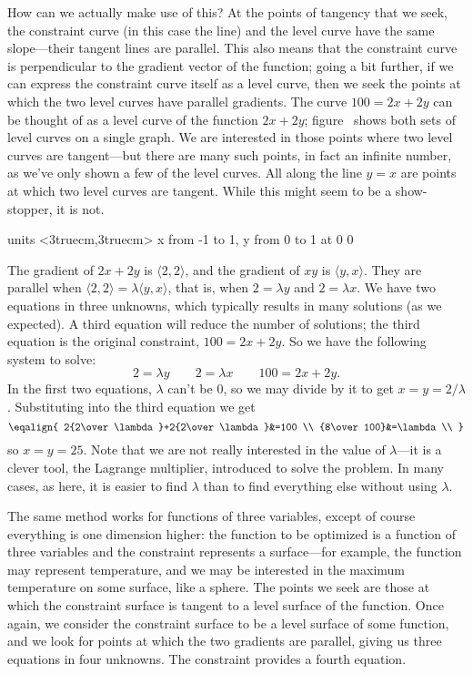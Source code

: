 How can we actually make use of this? At the points of tangency that
we seek, the constraint curve (in this case the line) and the level
curve have the same slope---their tangent lines are parallel. This also
means that the constraint curve is perpendicular to the gradient
vector of the function; going a bit further, if we can express the
constraint curve itself as a level curve, then we seek the points at
which the two level curves have parallel gradients.
The curve $100=2x+2y$ can be thought of as a level curve of the
function $2x+2y$; figure~ shows both sets of
level curves on a single graph. We are interested in those points
where two level curves are tangent---but there are many such points,
in fact an infinite number, as we've only shown a few of the level
curves. All along the line $y=x$ are points at which two level curves
are tangent. While this might seem to be a show-stopper, it is
not. 

\figure
\vbox{\beginpicture
\normalgraphs
\ninepoint
\setcoordinatesystem units <3truecm,3truecm>
\setplotarea x from -1 to 1, y from 0 to 1
 at 0 0
\endpicture}

The gradient of $2x+2y$ is $\langle 2,2\rangle$, and the gradient of
$xy$ is $\langle y,x\rangle$. They are parallel when
$\langle 2,2\rangle=\lambda\langle y,x\rangle$, that is, when
$2=\lambda y$ and $2=\lambda x$. We have two equations in three
unknowns, which typically results in many solutions (as we
expected). A third equation will reduce the number of solutions; the
third equation is the original constraint, $100=2x+2y$. So we have the
following system to solve:
$$2=\lambda y \qquad 2=\lambda x\qquad 100=2x+2y.$$
In the first two equations, $\lambda$ can't be 0, so we may divide by
it to get $x=y=2/\lambda$. Substituting into the third equation we get 
$$\eqalign{
2{2\over \lambda}+2{2\over \lambda}&=100 \\
{8\over100}&=\lambda \\
}$$
so $x=y=25$. Note that we are not really interested in the value of
$\lambda$---it is a clever tool, the Lagrange multiplier, introduced
to solve the problem. In many cases, as here, it is easier to find
$\lambda$ than to find everything else without using $\lambda$.

The same method works for functions of three variables, except of
course everything is one dimension higher: the function to be
optimized is a function of three variables and the constraint represents
a surface---for example, the function may represent temperature, and
we may be interested in the maximum temperature on some surface, like
a sphere.
The points we seek are those at which the constraint
surface is tangent to a level surface of the function. Once again, we
consider the constraint surface to be a level surface of some
function, and we look for points at which the two gradients are
parallel, giving us three equations in four unknowns. The constraint
provides a fourth equation.

